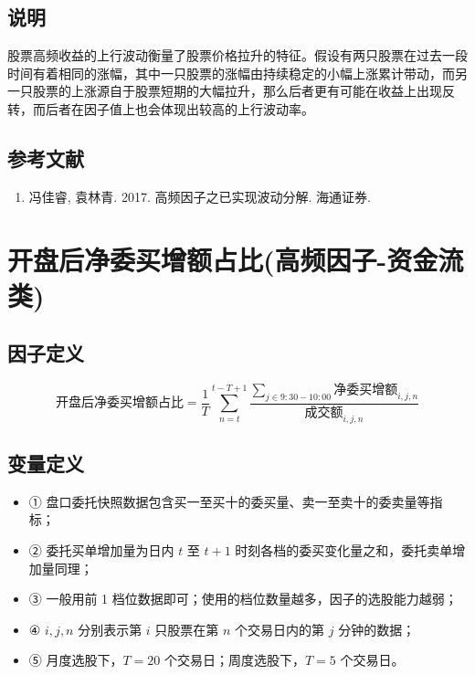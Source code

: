 \documentclass{article}
\begin{document}
\subsection{说明}
股票高频收益的上行波动衡量了股票价格拉升的特征。假设有两只股票在过去一段时间有着相同的涨幅，其中一只股票的涨幅由持续稳定的小幅上涨累计带动，而另一只股票的上涨源自于股票短期的大幅拉升，那么后者更有可能在收益上出现反转，而后者在因子值上也会体现出较高的上行波动率。

\subsection{参考文献}
\begin{enumerate}
    \item 冯佳睿, 袁林青. 2017. 高频因子之已实现波动分解. 海通证券.
\end{enumerate}

\section{开盘后净委买增额占比(高频因子-资金流类)}

\subsection{因子定义}
\begin{equation}
    \text{开盘后净委买增额占比}=\frac{1}{T} \sum_{n=t}^{t-T+1} \frac{\sum_{j \in 9:30-10:00} \text{净委买增额}_{i,j,n}}{ \text{成交额}_{i,j,n}}
\end{equation}

\subsection{变量定义}
\begin{itemize}
    \item ① 盘口委托快照数据包含买一至买十的委买量、卖一至卖十的委卖量等指标；
    \item ② 委托买单增加量为日内 \( t \) 至 \( t+1 \) 时刻各档的委买变化量之和，委托卖单增加量同理；
    \item ③ 一般用前 1 档位数据即可；使用的档位数量越多，因子的选股能力越弱；
    \item ④ \( i, j, n \) 分别表示第 \( i \) 只股票在第 \( n \) 个交易日内的第 \( j \) 分钟的数据；
    \item ⑤ 月度选股下，\( T=20 \) 个交易日；周度选股下，\( T=5 \) 个交易日。
\end{itemize}
\end{document}
